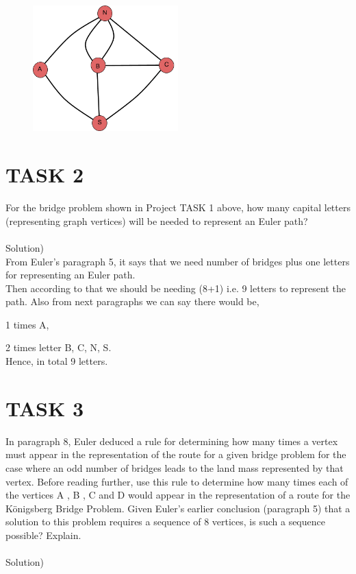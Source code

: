 \documentclass[acmsmall]{acmart}
\begin{document}
\begin{figure}[h]
  \centering
  \includegraphics[width=0.5\textwidth]{4}
  \caption{}
  \Description{}
\end{figure}

\clearpage

\section{TASK 2}

For the bridge problem shown in Project TASK 1 above, how many capital letters
(representing graph vertices) will be needed to represent an Euler path?\\
\\
Solution)\\

From Euler’s paragraph 5, it says that we need number of bridges plus one letters for
representing an Euler path.\\

Then according to that we should be needing (8+1) i.e. 9 letters to represent the path.
Also from next paragraphs we can say there would be,

1 times A,

2 times letter B, C, N, S.\\

Hence, in total 9 letters.
\clearpage

\section{TASK 3}

In paragraph 8, Euler deduced a rule for determining how many times a vertex must
appear in the representation of the route for a given bridge problem for the case where an
odd number of bridges leads to the land mass represented by that vertex. Before reading
further, use this rule to determine how many times each of the vertices A , B , C and D
would appear in the representation of a route for the Königsberg Bridge Problem. Given
Euler’s earlier conclusion (paragraph 5) that a solution to this problem requires a sequence
of 8 vertices, is such a sequence possible? Explain.\\
\\
Solution)\\
\end{document}
